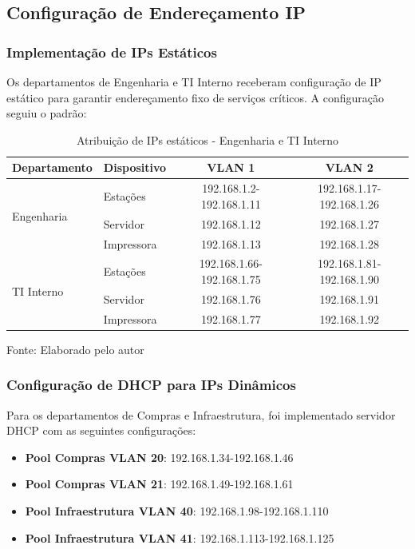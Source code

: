 \subsection{Configuração de Endereçamento IP}

\subsubsection{Implementação de IPs Estáticos}

Os departamentos de Engenharia e TI Interno receberam configuração de IP estático para garantir endereçamento fixo de serviços críticos. A configuração seguiu o padrão:

\begin{table}[H]
\centering
\caption{Atribuição de IPs estáticos - Engenharia e TI Interno}
\begin{tabular}{|l|l|c|c|}
\hline
\textbf{Departamento} & \textbf{Dispositivo} & \textbf{VLAN 1} & \textbf{VLAN 2} \\
\hline
\multirow{3}{*}{Engenharia} & Estações & 192.168.1.2-192.168.1.11 & 192.168.1.17-192.168.1.26 \\
\cline{2-4}
& Servidor & 192.168.1.12 & 192.168.1.27 \\
\cline{2-4}
& Impressora & 192.168.1.13 & 192.168.1.28 \\
\hline
\multirow{3}{*}{TI Interno} & Estações & 192.168.1.66-192.168.1.75 & 192.168.1.81-192.168.1.90 \\
\cline{2-4}
& Servidor & 192.168.1.76 & 192.168.1.91 \\
\cline{2-4}
& Impressora & 192.168.1.77 & 192.168.1.92 \\
\hline
\end{tabular}
\label{tab:ips_estaticos}
{\fontsize{10pt}{\baselineskip}\selectfont
Fonte: Elaborado pelo autor}
\end{table}

\subsubsection{Configuração de DHCP para IPs Dinâmicos}

Para os departamentos de Compras e Infraestrutura, foi implementado servidor DHCP com as seguintes configurações:

\begin{itemize}
    \item \textbf{Pool Compras VLAN 20}: 192.168.1.34-192.168.1.46
    \item \textbf{Pool Compras VLAN 21}: 192.168.1.49-192.168.1.61
    \item \textbf{Pool Infraestrutura VLAN 40}: 192.168.1.98-192.168.1.110
    \item \textbf{Pool Infraestrutura VLAN 41}: 192.168.1.113-192.168.1.125
\end{itemize}

